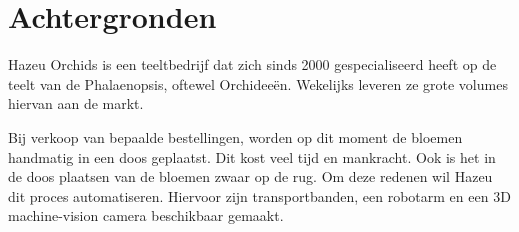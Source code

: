 
\section{Achtergronden}

Hazeu Orchids is een teeltbedrijf dat zich sinds 2000 gespecialiseerd heeft op de teelt van de Phalaenopsis, oftewel Orchideeën.
Wekelijks leveren ze grote volumes hiervan aan de markt.

\bigskip

Bij verkoop van bepaalde bestellingen, worden op dit moment de bloemen handmatig in een doos geplaatst.
Dit kost veel tijd en mankracht.
Ook is het in de doos plaatsen van de bloemen zwaar op de rug.
Om deze redenen wil Hazeu dit proces automatiseren.
Hiervoor zijn transportbanden, een robotarm en een 3D machine-vision camera beschikbaar gemaakt.

\newpage
